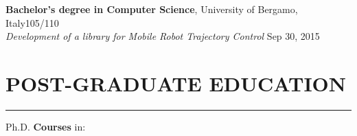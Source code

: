 \documentclass[10pt]{article}
\newcommand{\cvsection}[1]{\section*{\centering\normalsize\uppercase{#1}}\vspace{-16pt}\rule{\linewidth}{0.2pt}\vspace{6pt}}
\begin{document}
\vspace{6pt} %

\textbf{Bachelor's degree in Computer Science}, University of Bergamo, Italy\hfill 105\slash110 \\
\textit{Development of a library for Mobile Robot Trajectory Control} \hfill Sep 30, 2015


\cvsection{post-graduate education}
Ph.D. \textbf{Courses} in:
\end{document}
